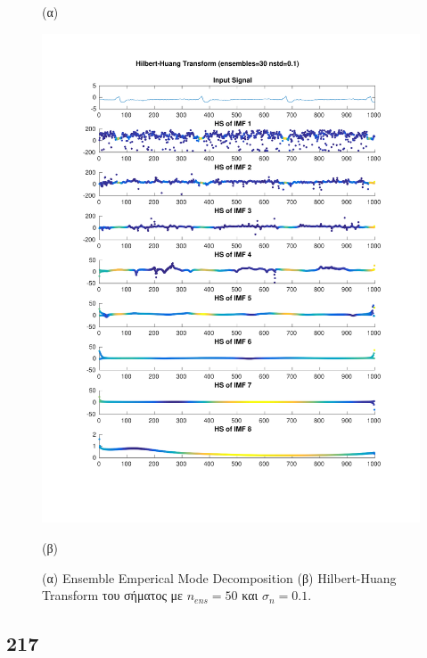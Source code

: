 \documentclass[11pt,a4paper]{article}
\begin{document}
\begin{figure}[H]
\begin{minipage}{0.48\textwidth}
	(α)
\end{minipage}
\begin{minipage}{0.48\textwidth}
	\centering
	\includegraphics[width=\textwidth]{fig/118l1_hht_ensemble.pdf}
	
	(β)
\end{minipage}
\vfill
\caption{(α) Ensemble Emperical Mode Decomposition (β) Hilbert-Huang Transform του σήματος με $n_{ens}=50$ και $\sigma_n = 0.1$.}
\label{fig:118l1_hht_ensemble}
\end{figure}

\subsection*{217}
\end{document}
